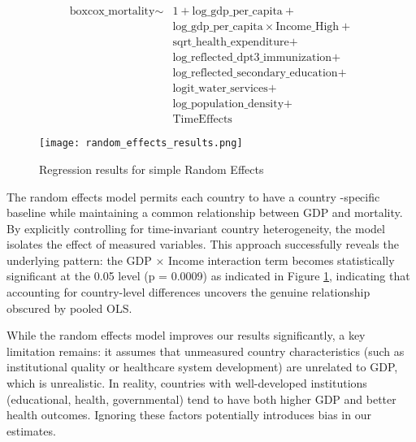 \documentclass[10pt,a4paper]{article}
\begin{document}
    \begin{equation}
    \begin{split}
    \text{boxcox\_mortality} \sim & 1 + \text{log\_gdp\_per\_capita} + \\
    & \text{log\_gdp\_per\_capita} \times \text{Income\_High} + \\
    & \text{sqrt\_health\_expenditure} + \\
    & \text{log\_reflected\_dpt3\_immunization} + \\
    & \text{log\_reflected\_secondary\_education} + \\
    & \text{logit\_water\_services} + \\
    & \text{log\_population\_density} + \\
    & \text{TimeEffects}
    \end{split}
    \end{equation}

    \begin{figure}[H]
    \centering
    \begin{minipage}{0.7\textwidth}
        \centering
        \texttt{[image: random\_effects\_results.png]}
    \end{minipage}
    \caption{Regression results for simple Random Effects}
    \label{fig:random_effects_regression}
    \end{figure}    

    The random effects model permits each country to have a country -specific baseline while maintaining a common relationship between GDP and mortality. By explicitly controlling for time-invariant country heterogeneity, the model isolates the effect of measured variables. This approach successfully reveals the underlying pattern: the GDP × Income interaction term becomes statistically significant at the 0.05 level (p = 0.0009) as indicated in Figure \ref{fig:random_effects_regression}, indicating that accounting for country-level differences uncovers the genuine relationship obscured by pooled OLS.
    
    While the random effects model improves our results significantly, a key limitation remains: it assumes that unmeasured country characteristics (such as institutional quality or healthcare system development) are unrelated to GDP, which is unrealistic. In reality, countries with well-developed institutions (educational, health, governmental) tend to have both higher GDP and better health outcomes. Ignoring these factors potentially introduces bias in our estimates.
    
\end{document}
